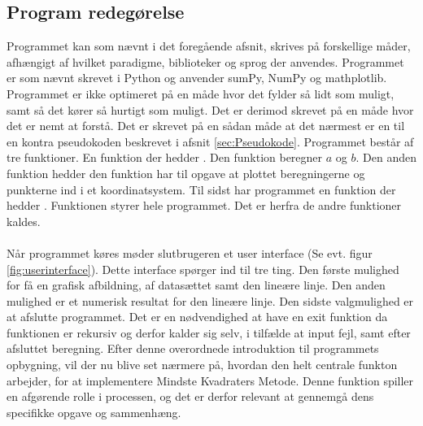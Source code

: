 \subsection{Program redegørelse}
Programmet kan som nævnt i det foregående afsnit, skrives på forskellige måder, afhængigt af hvilket paradigme, biblioteker og sprog der anvendes. Programmet  er som nævnt skrevet i Python og anvender sumPy, NumPy og mathplotlib. Programmet er ikke optimeret på en måde hvor det fylder så lidt som muligt, samt så det kører så hurtigt som muligt. Det er derimod skrevet på en måde hvor det er nemt at forstå. Det er skrevet på en sådan måde at det nærmest er en til en kontra pseudokoden beskrevet i afsnit \ref{sec:Pseudokode}. Programmet består af tre funktioner. En funktion der hedder . Den funktion beregner $a$ og $b$. Den anden funktion hedder  den funktion har til opgave at plottet beregningerne og punkterne ind i et koordinatsystem. Til sidst har programmet en funktion der hedder . Funktionen  styrer hele programmet. Det er herfra de andre funktioner kaldes.  \\\\ Når programmet køres møder slutbrugeren et user interface (Se evt. figur \ref{fig:userinterface}). Dette interface spørger ind til tre ting. Den første mulighed for få en grafisk afbildning, af datasættet samt den lineære linje. Den anden mulighed er et numerisk resultat for den lineære linje. Den sidste valgmulighed er at afslutte programmet. Det er en nødvendighed at have en exit funktion da funktionen  er rekursiv og derfor kalder sig selv, i tilfælde at input fejl, samt efter afsluttet beregning. Efter denne overordnede introduktion til programmets opbygning, vil der nu blive set nærmere på, hvordan den helt centrale funkton arbejder, for at implementere Mindste Kvadraters Metode. Denne funktion spiller en afgørende rolle i processen, og det er derfor relevant at gennemgå dens specifikke opgave og sammenhæng. 

